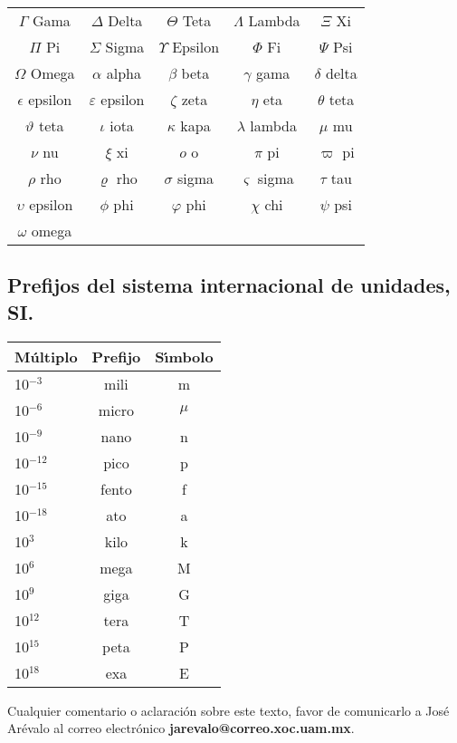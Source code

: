 \documentclass[letterpaper,spanish,12pt]{article}
\begin{document}
\begin{center}
\begin{tabular}{ccccc}
 $\Gamma     $ Gama&
 $\Delta     $ Delta&
 $\Theta     $ Teta&
 $\Lambda    $ Lambda&
 $\Xi        $ Xi \\ 
 $\Pi        $ Pi&
 $\Sigma     $ Sigma&
 $\Upsilon   $ Epsilon&
 $\Phi       $ Fi&
 $\Psi       $ Psi \\
 $\Omega     $ Omega & 
 $\alpha     $ alpha &
 $\beta      $ beta&
 $\gamma     $ gama &
 $\delta     $ delta \\
 $\epsilon   $ epsilon &
 $\varepsilon$ epsilon&
 $\zeta      $ zeta&
 $\eta       $ eta&
 $\theta     $ teta \\
 $\vartheta  $ teta &
 $\iota      $ iota &
 $\kappa     $ kapa& 
 $\lambda    $ lambda&
 $\mu        $ mu \\
 $\nu        $ nu &
 $\xi        $ xi&
 $o          $ o&
 $\pi        $ pi&
 $\varpi     $ pi \\
 $\rho       $ rho&
 $\varrho    $ rho&
 $\sigma     $ sigma &
 $\varsigma  $ sigma&
 $\tau       $ tau \\
 $\upsilon   $ epsilon&
 $\phi       $ phi&
 $\varphi    $ phi&
 $\chi       $ chi&
 $\psi       $ psi \\
 $\omega     $ omega &
 $        $ &
 $        $ &
 $        $ &
 $        $ \\
\end{tabular}
\end{center}
\vspace{0.5cm}


\subsection*{Prefijos del sistema internacional de unidades, SI.}

\vspace{0.5cm}
\begin{center}
\begin{tabular}{lcc}
M\'{u}ltiplo & Prefijo & S\'{\i}mbolo \\ \hline
10$^{-3}$ & mili & m \\ 
10$^{-6}$ & micro & $\mu$ \\
10$^{-9}$ & nano & n \\  
10$^{-12}$ & pico & p \\ 
10$^{-15}$ & fento & f \\ 
10$^{-18}$ & ato & a \\ \hline \hline
10$^{3}$ & kilo & k \\ 
10$^{6}$ & mega & M\\   
10$^{9}$ & giga & G\\   
10$^{12}$ & tera & T \\   
10$^{15}$ & peta & P\\   
10$^{18}$ & exa & E \\ \hline
\end{tabular}
\end{center}
\vfill


Cualquier comentario o aclaraci\'{o}n sobre este texto, favor de
comunicarlo a Jos\'{e} Ar\'{e}valo al correo electr\'{o}nico
\textbf{jarevalo@correo.xoc.uam.mx}.

\end{document}
